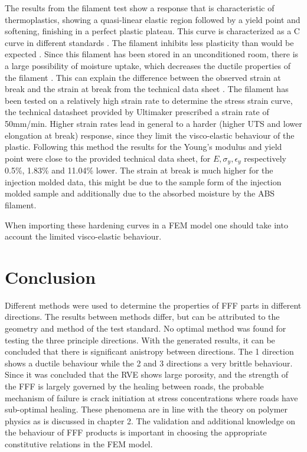 The results from the filament test show a response that is characteristic of thermoplastics, showing a quasi-linear elastic region followed by a yield point and softening, finishing in a perfect plastic plateau. This curve is characterized as a C curve in different standards \cite{Afd2016NEN-EN-ISO527-2,Fahrenholz2018TheZwick/Roell}. The filament inhibits less plasticity than would be expected \cite{Rodriguez2001MechanicalInvestigation}. Since this filament has been stored in an unconditioned room, there is a large possibility of moisture uptake, which decreases the ductile properties of the filament \cite{Turner2014AModeling}. This can explain the difference between the observed strain at break and the strain at break from the technical data sheet \cite{Ultimaker2018TechnicalABS}. 
The filament has been tested on a relatively high strain rate to determine the stress strain curve, the technical datasheet provided by Ultimaker prescribed a strain rate of 50mm/min. Higher strain rates lead in general to a harder (higher UTS and lower elongation at break) response, since they limit the visco-elastic behaviour of the plastic. Following this method the results for the Young's modulus and yield point were close to the provided technical data sheet, for $E, \sigma_y, \epsilon_y$ respectively 0.5\%, 1.83\% and 11.04\% lower. The strain at break is much higher for the injection molded data, this might be due to the sample form of the injection molded sample and additionally due to the absorbed moisture by the ABS filament.  

When importing these hardening curves in a FEM model one should take into account the limited visco-elastic behaviour. 

\section{Conclusion}
Different methods were used to determine the properties of FFF parts in different directions. The results between methods differ, but can be attributed to the geometry and method of the test standard. No optimal method was found for testing the three principle directions. With the generated results, it can be concluded that there is significant anistropy  between directions. The 1 direction shows a ductile behaviour while the 2 and 3 directions a very brittle behaviour. Since it was concluded that the RVE shows large porosity, and the strength of the FFF is largely governed by the healing  between roads, the probable mechanism of failure is crack initiation at stress concentrations where roads have sub-optimal healing. These phenomena are in line with the theory on polymer physics as is discussed in chapter 2. The validation and additional knowledge on the behaviour of FFF products is important in choosing the appropriate constitutive relations in the FEM model. 
 
